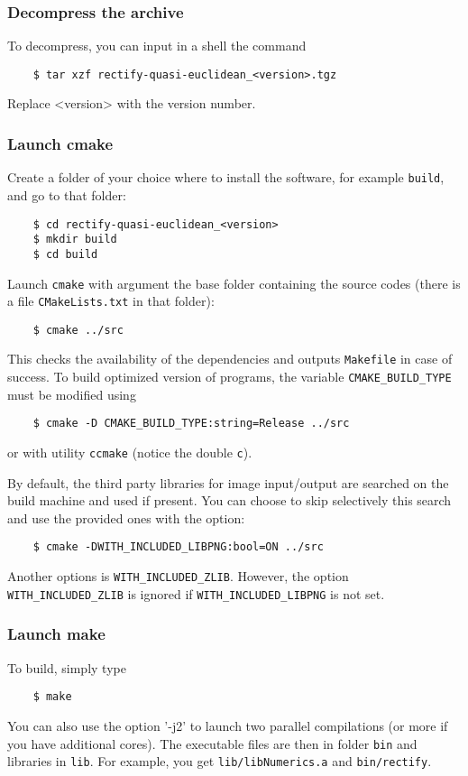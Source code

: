 \documentclass[a4paper]{article}
\begin{document}
\subsubsection{Decompress the archive}
To decompress, you can input in a shell the command
\begin{verbatim}
    $ tar xzf rectify-quasi-euclidean_<version>.tgz
\end{verbatim}
Replace <version> with the version number.

\subsubsection{Launch cmake}
Create a folder of your choice where to install the software, for example \texttt{build}, and go to that folder:
\begin{verbatim}
    $ cd rectify-quasi-euclidean_<version>
    $ mkdir build
    $ cd build
\end{verbatim}
Launch \texttt{cmake} with argument the base folder containing the source codes (there is a file \texttt{CMakeLists.txt} in that folder):
\begin{verbatim}
    $ cmake ../src
\end{verbatim}
This checks the availability of the dependencies and outputs \texttt{Makefile} in case of success. To build optimized version of programs, the variable \texttt{CMAKE\_BUILD\_TYPE} must be modified using
\begin{verbatim}
    $ cmake -D CMAKE_BUILD_TYPE:string=Release ../src
\end{verbatim}
or with utility \texttt{ccmake} (notice the double \texttt{c}).

By default, the third party libraries for image input/output are searched on the build machine and used if present. You can choose to skip selectively this search and use the provided ones with the option:
\begin{verbatim}
    $ cmake -DWITH_INCLUDED_LIBPNG:bool=ON ../src
\end{verbatim}
Another options is \verb|WITH_INCLUDED_ZLIB|. However, the option \verb|WITH_INCLUDED_ZLIB| is ignored if \verb|WITH_INCLUDED_LIBPNG| is not set.

\subsubsection{Launch make}
To build, simply type
\begin{verbatim}
    $ make
\end{verbatim}
You can also use the option '-j2' to launch two parallel compilations (or more if you have additional cores). The executable files are then in folder \texttt{bin} and libraries in \texttt{lib}. For example, you get \texttt{lib/libNumerics.a} and \texttt{bin/rectify}.
\end{document}
